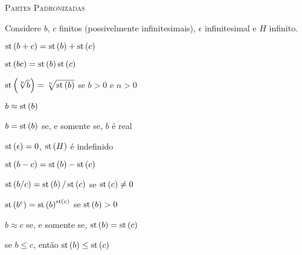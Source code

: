 \documentclass{svmono}
\begin{document}
\textsc{Partes Padronizadas}

Considere $b$, $c$ finitos (possivelmente infinitesimais),
$\epsilon$ infinitesimal e $H$ infinito.

\begin{multicols}{2}
$\st{b + c} = \st{b} + \st{c}$

$\st{b c} = \st{b} \st{c}$

$\st{\sqrt[n]{b}} = \sqrt[n]{\st{b}}$ se $b > 0$ e $n > 0$

$b \approx \st{b}$

$b = \st{b}$ se, e somente se, $b$ é real

$\st{\epsilon} = 0$, \SPC $\st{H}$ é indefinido

$\st{b - c} = \st{b} - \st{c}$

$\st{b/c} = \st{b} / \st{c}$ se $\st{c} \ne 0$

$\st{b^c} = \st{b}^{\st{c}}$ se $\st{b} > 0$

$b \approx c$ se, e somente se, $\st{b} = \st{c}$

se $b \le c$, então $\st{b} \le \st{c}$\\
\end{multicols}
\end{document}
